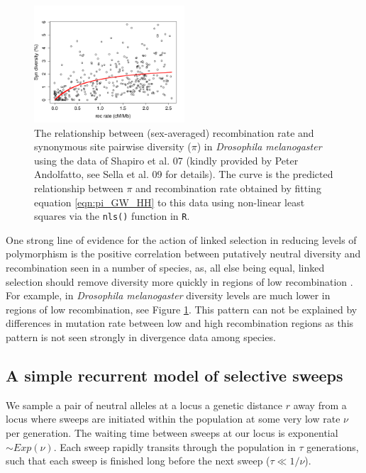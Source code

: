\begin{figure}
\begin{center}
\includegraphics[width=0.5\textwidth]{figures/Genomewide_HH.png}
\end{center}
\caption{The relationship between (sex-averaged) recombination rate and synonymous
  site pairwise diversity ($\pi$) in {\it Drosophila melanogaster}
  using the data of Shapiro et al. 07 (kindly provided by Peter
  Andolfatto, see Sella et al. 09 for details). The curve is the
  predicted relationship between $\pi$ and recombination rate obtained
  by fitting equation \eqref{eqn:pi_GW_HH} to this data 
 using non-linear least squares via the {\tt nls()} function in {\tt R}.} \label{fig:GW_hitchhiking_reduction}
\end{figure}

One strong line of evidence for the action of linked selection in reducing levels of
polymorphism is the positive correlation between putatively
neutral diversity and recombination seen in a number of species, as, all
else being equal, linked selection should remove diversity more quickly in regions of low recombination 
\citep{Aguade:89,Begun:92,Wiehe:93,Cutter:10,Hellmann:08,Cai:09,
  cutter2013}. For example, in {\it Drosophila melanogaster} diversity
levels are much lower in regions of low recombination, see
Figure \ref{fig:GW_hitchhiking_reduction}. This pattern can not be
explained by differences in mutation rate between low and high
recombination regions as this pattern is not seen strongly in
divergence data among species.


\subsection{A simple recurrent model of selective sweeps}
We sample a pair of neutral alleles at a locus a genetic distance $r$ away from a locus where
sweeps are initiated within the population at some very low rate $\nu$
per generation. The waiting time between sweeps
at our locus is exponential $\sim Exp(\nu)$. Each sweep rapidly transits through the population in $\tau$
generations, such that each sweep is finished long before the next
sweep ($\tau \ll 1/\nu$). \\

